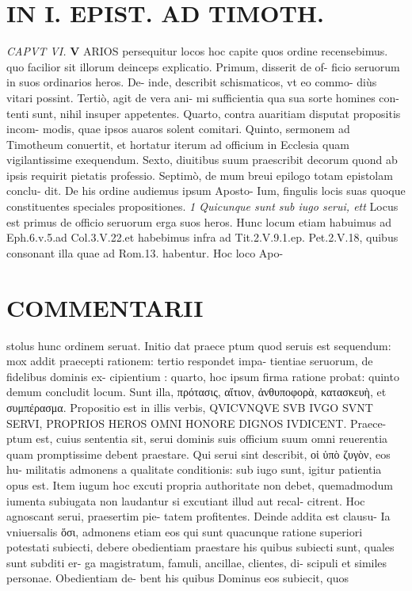 \documentclass{article}
\begin{document}
\begin{pages}
\section*{IN I. EPIST. AD TIMOTH. }
\marginpar{[ p.143 ]}
\textit{CAPVT VI. }
\textbf{V }\pstart ARIOS persequitur locos hoc capite quos ordine recensebimus. quo facilior sit illorum deinceps explicatio. Primum, disserit de of- ficio seruorum in suos ordinarios heros. De- inde, describit schismaticos, vt eo commo- diùs vitari possint. Tertiò, agit de vera ani- mi sufficientia qua sua sorte homines con- tenti sunt, nihil insuper appetentes. Quarto, contra auaritiam disputat propositis incom- modis, quae ipsos auaros solent comitari. Quinto, sermonem ad Timotheum conuertit, et hortatur iterum ad officium in Ecclesia quam vigilantissime exequendum. Sexto, diuitibus suum praescribit decorum quond ab ipsis requirit pietatis professio. Septimò, de mum breui epilogo totam epistolam conclu- dit. De his ordine audiemus ipsum Aposto- Ium, fingulis locis suas quoque constituentes speciales propositiones.  \pend
\textit{1 Quicunque sunt sub iugo serui, ett }\pstart Locus est primus de officio seruorum erga suos heros. Hunc locum etiam habuimus ad Eph.6.v.5.ad Col.3.V.22.et habebimus infra ad Tit.2.V.9.1.ep. Pet.2.V.18, quibus consonant illa quae ad Rom.13. habentur. Hoc loco Apo-  \pend
\marginpar{[ p.144 ]}
\section*{COMMENTARII }\pstart stolus hunc ordinem seruat. Initio dat praece ptum quod seruis est sequendum: mox addit praecepti rationem: tertio respondet impa- tientiae seruorum, de fidelibus dominis ex- cipientium : quarto, hoc ipsum firma ratione probat: quinto demum concludit locum. Sunt illa, πρότασις, αἴτιον, ἀνθυποφορὰ, κατασκευὴ, et συμπέρασμα.  \pend\pstart Propositio est in illis verbis, QVICVNQVE SVB IVGO SVNT SERVI, PROPRIOS HEROS OMNI HONORE DIGNOS IVDICENT. Praece- ptum est, cuius sententia sit, serui dominis suis officium suum omni reuerentia quam promptissime debent praestare.  \pend\pstart Qui serui sint describit, οἱ ὑπὸ ζυγὸν, eos hu- militatis admonens a qualitate conditionis: sub iugo sunt, igitur patientia opus est. Item iugum hoc excuti propria authoritate non debet, quemadmodum iumenta subiugata non laudantur si excutiant illud aut recal- citrent. Hoc agnoscant serui, praesertim pie- tatem profitentes. Deinde addita est clausu- Ia vniuersalis ὅσι, admonens etiam eos qui sunt quacunque ratione superiori potestati subiecti, debere obedientiam praestare his quibus subiecti sunt, quales sunt subditi er- ga magistratum, famuli, ancillae, clientes, di- scipuli et similes personae. Obedientiam de- bent his quibus Dominus eos subiecit, quos  \pend

\end{pages}
\end{document}
